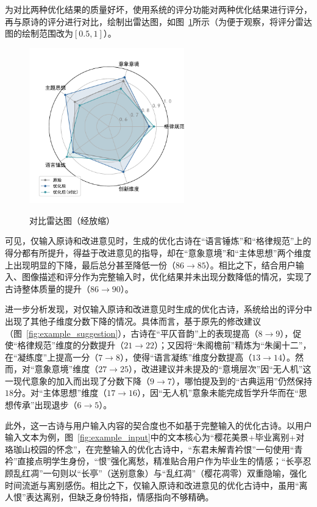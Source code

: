 为对比两种优化结果的质量好坏，使用系统的评分功能对两种优化结果进行评分，再与原诗的评分进行对比，绘制出雷达图，如图~\ref{fig:radar_comparison}所示（为便于观察，将评分雷达图的绘制范围改为$[0.5,1]$）。

\begin{figure}[ht]
  \centering
  \includegraphics[width=0.6\textwidth]
  {figures/雷达图（对比）.pdf}\\
  \caption{对比雷达图（经放缩）}
  \label{fig:radar_comparison} %
\end{figure}

可见，仅输入原诗和改进意见时，生成的优化古诗在“语言锤炼”和“格律规范”上的得分都有所提升，得益于改进意见的指导，却在“意象意境”和“主体思想”两个维度上出现明显的下降，最后总分甚至降低一份（$86\rightarrow85$）。相比之下，结合用户输入、图像描述和评分作为完整输入时，优化结果并未出现分数降低的情况，实现了古诗整体质量的提升（$86\rightarrow90$）。 

进一步分析发现，对仅输入原诗和改进意见时生成的优化古诗，系统给出的评分中出现了其他子维度分数下降的情况。具体而言，基于原先的修改建议（图~\ref{fig:example_suggestion}），古诗在“平仄音韵”上的表现提高（$8\rightarrow9$），促使“格律规范”维度的分数提升（$21\rightarrow22$）；又因将“朱阁檐前”精炼为“朱阑十二”，在“凝练度”上提高一分（$7\rightarrow8$），使得“语言凝练”维度分数提高（$13\rightarrow14$）。然而，对“意象意境”维度（$27\rightarrow25$），改进建议并未提及的“意境层次”因“无人机”这一现代意象的加入而出现了分数下降（$9\rightarrow7$），哪怕提及到的“古典运用”仍然保持$18$分。对“主体思想”维度（$17\rightarrow16$），因“无人机”意象未能完成哲学升华而在“思想传承”出现退步（$6\rightarrow5$）。

此外，这一古诗与用户输入内容的契合度也不如基于完整输入的优化古诗。以用户输入文本为例，图~\ref{fig:example_input}中的文本核心为“樱花美景+毕业离别+对珞珈山校园的怀念”，在完整输入的优化古诗中，“东君未解青衿恨”一句使用“青衿”直接点明学生身份，“恨”强化离愁，精准贴合用户作为毕业生的情感；“长亭忍顾乱红凋”一句则以“长亭”（送别意象）与“乱红凋”（樱花凋零）双重隐喻，强化时间流逝与离别感伤。相比之下，仅输入原诗和改进意见的优化古诗中，虽用“离人恨”表达离别，但缺乏身份特指，情感指向不够精确。

